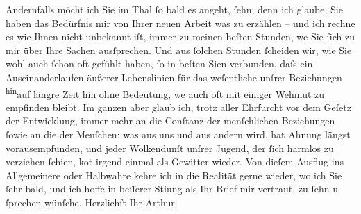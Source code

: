                Andernfalls möcht ich Sie im Thal ſo bald es angeht, ſehn; denn ich glaube, {\pb}Sie haben das Bedürfnis mir von Ihrer neuen Arbeit was zu erzählen – und
               ich rechne es wie Ihnen nicht unbekannt iſt, immer zu meinen beſten Stunden, we{\geminationn} Sie ſich zu mir über Ihre Sachen ausſprechen. Und aus
               ſolchen Stunden ſcheiden wir, wie Sie wohl auch ſchon oft gefühlt haben, ſo in beſten
                  Si{\geminationn}en verbunden, daſs ein Auseinanderlaufen äußerer
               Lebenslinien für das weſentliche unſrer Beziehungen \substVorne{}\textsuperscript{hin}\substDazwischen{}auf\substHinten{} längre Zeit \introOben{}hin\introOben{} ohne Bedeutung, we{\geminationn} auch oft mit einiger Wehmut zu empfinden bleibt. Im
               ganzen aber glaub ich, trotz aller Ehrfurcht vor dem Geſetz der Entwicklung, immer
               mehr an die Conſtanz der \introOben{}menſchlichen\introOben{} Beziehungen \introOben{}ſo\introOben{}wie an die der Menſchen: was aus uns und aus andern wird,
               hat Ahnung längst vorausempfunden, und jeder Wolkendunſt unſrer Jugend, der ſich
               harmlos zu verziehen ſchien, ko{\geminationm}t irgend einmal als
               Gewitter wieder. Von dieſem Ausflug ins Allgemeinere oder Halbwahre kehre ich in die
               Realität gerne wieder, wo ich Sie ſehr bald, und ich hoffe in beſſerer Sti{\geminationm}ung als Ihr Brief mir vertraut, zu ſehn u ſprechen
               wünſche.\pend
           \pstart Herzlichſt Ihr \spacefill\mbox{Arthur.}\pend{}\endnumbering{}  
      